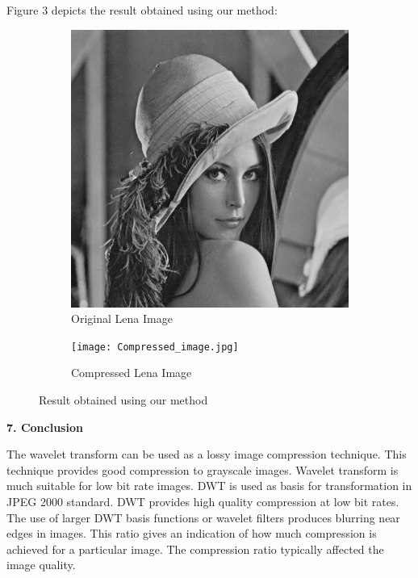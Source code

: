 \documentclass{article}
\begin{document}
\begin{flushleft}Figure 3 depicts the result obtained using our method: \end{flushleft}

\begin{figure}[htp]
  \begin{subfigure}[b]{0.4\textwidth}
    \includegraphics[width=\textwidth]{greyscale_lenna.jpg}
    \caption{Original Lena Image}
    \label{fig:greyscale_lenna}
  \end{subfigure}
  \hfill
  \begin{subfigure}[b]{0.4\textwidth}
    \texttt{[image: Compressed\_image.jpg]}
    \caption{Compressed Lena Image}
    \label{fig:Compressed_image}
  \end{subfigure}
  \caption{Result obtained using our method}
\end{figure}


\begin{flushleft}
\textbf{\large 7. Conclusion}
\end{flushleft}

The wavelet transform can be used as a lossy image compression technique. This technique provides good compression to grayscale images. Wavelet transform is much suitable for low bit rate images. DWT is used as basis for transformation in JPEG 2000 standard. DWT provides high quality compression at low bit rates. The use of larger DWT basis functions or wavelet filters produces blurring near edges in images. This ratio gives an indication of how much compression is achieved for a particular image. The compression ratio typically affected the image quality.\\ 
\end{document}
